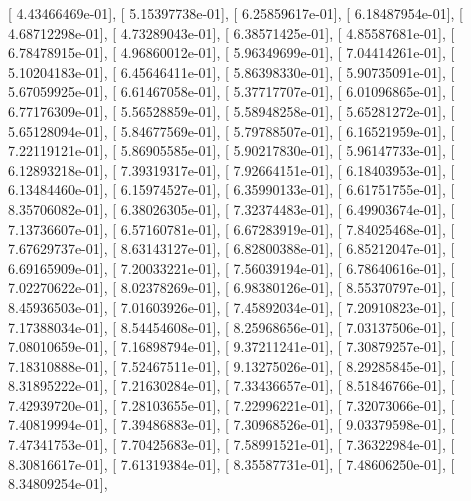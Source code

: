 \documentclass{article}
\begin{document}
       [  4.43466469e-01],
       [  5.15397738e-01],
       [  6.25859617e-01],
       [  6.18487954e-01],
       [  4.68712298e-01],
       [  4.73289043e-01],
       [  6.38571425e-01],
       [  4.85587681e-01],
       [  6.78478915e-01],
       [  4.96860012e-01],
       [  5.96349699e-01],
       [  7.04414261e-01],
       [  5.10204183e-01],
       [  6.45646411e-01],
       [  5.86398330e-01],
       [  5.90735091e-01],
       [  5.67059925e-01],
       [  6.61467058e-01],
       [  5.37717707e-01],
       [  6.01096865e-01],
       [  6.77176309e-01],
       [  5.56528859e-01],
       [  5.58948258e-01],
       [  5.65281272e-01],
       [  5.65128094e-01],
       [  5.84677569e-01],
       [  5.79788507e-01],
       [  6.16521959e-01],
       [  7.22119121e-01],
       [  5.86905585e-01],
       [  5.90217830e-01],
       [  5.96147733e-01],
       [  6.12893218e-01],
       [  7.39319317e-01],
       [  7.92664151e-01],
       [  6.18403953e-01],
       [  6.13484460e-01],
       [  6.15974527e-01],
       [  6.35990133e-01],
       [  6.61751755e-01],
       [  8.35706082e-01],
       [  6.38026305e-01],
       [  7.32374483e-01],
       [  6.49903674e-01],
       [  7.13736607e-01],
       [  6.57160781e-01],
       [  6.67283919e-01],
       [  7.84025468e-01],
       [  7.67629737e-01],
       [  8.63143127e-01],
       [  6.82800388e-01],
       [  6.85212047e-01],
       [  6.69165909e-01],
       [  7.20033221e-01],
       [  7.56039194e-01],
       [  6.78640616e-01],
       [  7.02270622e-01],
       [  8.02378269e-01],
       [  6.98380126e-01],
       [  8.55370797e-01],
       [  8.45936503e-01],
       [  7.01603926e-01],
       [  7.45892034e-01],
       [  7.20910823e-01],
       [  7.17388034e-01],
       [  8.54454608e-01],
       [  8.25968656e-01],
       [  7.03137506e-01],
       [  7.08010659e-01],
       [  7.16898794e-01],
       [  9.37211241e-01],
       [  7.30879257e-01],
       [  7.18310888e-01],
       [  7.52467511e-01],
       [  9.13275026e-01],
       [  8.29285845e-01],
       [  8.31895222e-01],
       [  7.21630284e-01],
       [  7.33436657e-01],
       [  8.51846766e-01],
       [  7.42939720e-01],
       [  7.28103655e-01],
       [  7.22996221e-01],
       [  7.32073066e-01],
       [  7.40819994e-01],
       [  7.39486883e-01],
       [  7.30968526e-01],
       [  9.03379598e-01],
       [  7.47341753e-01],
       [  7.70425683e-01],
       [  7.58991521e-01],
       [  7.36322984e-01],
       [  8.30816617e-01],
       [  7.61319384e-01],
       [  8.35587731e-01],
       [  7.48606250e-01],
       [  8.34809254e-01],
\end{document}
